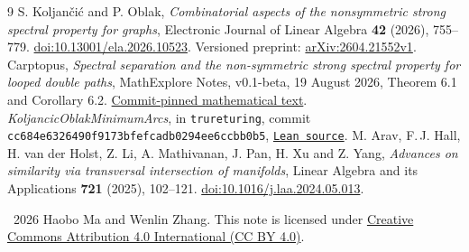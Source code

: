 \documentclass[11pt]{article}
\newcommand{\leanlink}[1]{\href{https://github.com/the-omega-institute/trureturing/blob/cc684e6326490f9173bfefcadb0294ee6ccbb0b5/D5/S3/Combinatorics/SpectralGraph/KoljancicOblakMinimumArcs.lean}{\texttt{#1}}}
\begin{document}
\begin{thebibliography}{9}
S. Koljan\v{c}i\'{c} and P. Oblak,
\emph{Combinatorial aspects of the nonsymmetric strong spectral property
for graphs}, Electronic Journal of Linear Algebra \textbf{42} (2026),
755--779. \href{https://doi.org/10.13001/ela.2026.10523}{doi:10.13001/ela.2026.10523}.
Versioned preprint: \href{https://arxiv.org/abs/2604.21552v1}{arXiv:2604.21552v1}.
Carptopus, \emph{Spectral separation and the non-symmetric strong spectral
property for looped double paths}, MathExplore Notes, v0.1-beta,
19 August 2026, Theorem 6.1 and Corollary 6.2.
\href{https://github.com/Carptopus/MathExplore-Notes/blob/e57ee007380cbc351eb371d8e991303cab5f1e48/research/nssp-looped-double-paths/nssp-looped-double-paths.tex}{Commit-pinned mathematical text}.
\emph{KoljancicOblakMinimumArcs}, in \texttt{trureturing},
commit \texttt{cc684e6326490f9173bfefcadb0294ee6ccbb0b5},
\leanlink{Lean source}.
M. Arav, F.\,J. Hall, H. van der Holst, Z. Li, A. Mathivanan,
J. Pan, H. Xu and Z. Yang,
\emph{Advances on similarity via transversal intersection of manifolds},
Linear Algebra and its Applications \textbf{721} (2025), 102--121.
\href{https://doi.org/10.1016/j.laa.2024.05.013}{doi:10.1016/j.laa.2024.05.013}.
\end{thebibliography}
\medskip
\noindent\small\textcopyright\ 2026 Haobo Ma and Wenlin Zhang.
This note is licensed under
\href{https://creativecommons.org/licenses/by/4.0/}{Creative Commons Attribution 4.0 International (CC BY 4.0)}.
\end{document}
